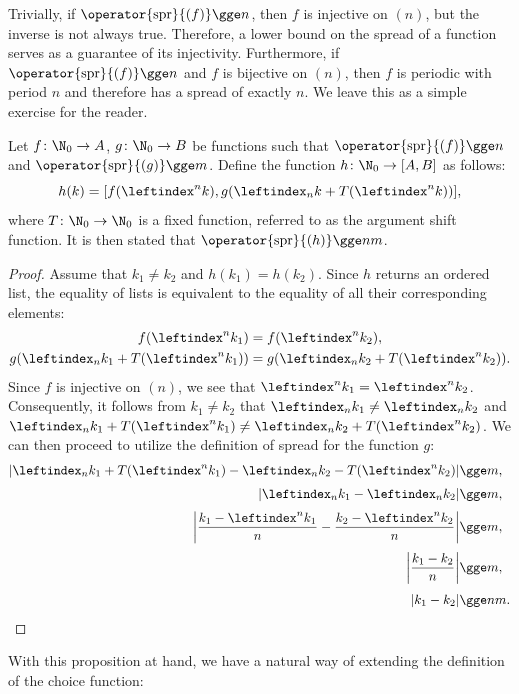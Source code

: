 \documentclass[12pt, a4paper]{article}
\newcommand{\spr}[1]{\operator{\mathrm{spr}}{(#1)}}
\newcommand{\lli}[1]{\leftindex_{#1}}
\newcommand{\lui}[1]{\leftindex^{#1}}
\begin{document}
Trivially, if $ \spr{f} \gge n $, then $ f $ is injective on $ (n) $, but the inverse is not always true. Therefore, a lower bound on the spread of a function serves as a guarantee of its injectivity. Furthermore, if $ \spr{f} \gge n $ and $ f $ is bijective on $ (n) $, then $ f $ is periodic with period $ n $ and therefore has a spread of exactly $ n $. We leave this as a simple exercise for the reader.

\begin{proposition}\label{map}
    Let $ f \colon \N_0 \to A $, $ g \colon \N_0 \to B $ be functions such that $ \spr{f} \gge n $ and $ \spr{g} \gge m $. Define the function $ h \colon \N_0 \to [A, B] $ as follows:
    \[ h(k) = [f(\lui{n}k), g(\lli{n}k + T(\lui{n}k))], \]
    where $ T \colon \N_0 \to \N_0 $ is a fixed function, referred to as the argument shift function. It is then stated that $ \spr{h} \gge nm $.
\end{proposition}
\begin{proof}
    Assume that $ k_1 \ne k_2 $ and $ h(k_1) = h(k_2) $. Since $ h $ returns an ordered list, the equality of lists is equivalent to the equality of all their corresponding elements:
    \begin{gather}
        f(\lui{n}k_1) = f(\lui{n}k_2),\label{one}\\
        g(\lli{n}k_1 + T(\lui{n}k_1)) = g(\lli{n}k_2 + T(\lui{n}k_2)).\label{two}
    \end{gather}
    Since $ f $ is injective on $ (n) $, we see that $ \lui{n}k_1 = \lui{n}k_2 $. Consequently, it follows from $ k_1 \ne k_2 $ that $ \lli{n}k_1 \ne \lli{n}k_2 $ and $ \lli{n}k_1 + T(\lui{n}k_1) \ne \lli{n}k_2 + T(\lui{n}k_2) $. We can then proceed to utilize the definition of spread for the function $ g $:
    \begin{align*}
    | \lli{n}k_1 + T(\lui{n}k_1) - \lli{n}k_2 - T(\lui{n}k_2) | &\gge m,\\[1mm]
    | \lli{n}k_1 - \lli{n}k_2 | &\gge m,\\[1mm]
    \left| \frac{k_1 - \lui{n}k_1}{n} - \frac{k_2 - \lui{n}k_2}{n} \right| &\gge m,\\[1mm]
    \left| \frac{k_1 - k_2}{n} \right| &\gge m,\\[1mm]
    | k_1 - k_2 | &\gge nm.
    \end{align*}
\end{proof}

With this proposition at hand, we have a natural way of extending the definition of the choice function:
\end{document}
